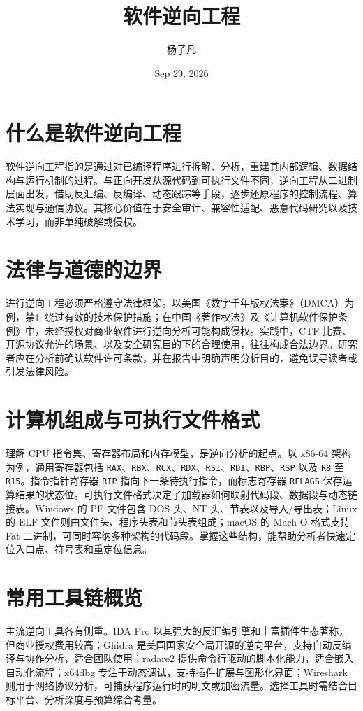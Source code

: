\title{软件逆向工程}
\author{杨子凡}
\date{Sep 29, 2026}
\maketitle
\chapter{什么是软件逆向工程}
软件逆向工程指的是通过对已编译程序进行拆解、分析，重建其内部逻辑、数据结构与运行机制的过程。与正向开发从源代码到可执行文件不同，逆向工程从二进制层面出发，借助反汇编、反编译、动态跟踪等手段，逐步还原程序的控制流程、算法实现与通信协议。其核心价值在于安全审计、兼容性适配、恶意代码研究以及技术学习，而非单纯破解或侵权。\par
\chapter{法律与道德的边界}
进行逆向工程必须严格遵守法律框架。以美国《数字千年版权法案》（DMCA）为例，禁止绕过有效的技术保护措施；在中国《著作权法》及《计算机软件保护条例》中，未经授权对商业软件进行逆向分析可能构成侵权。实践中，CTF 比赛、开源协议允许的场景、以及安全研究目的下的合理使用，往往构成合法边界。研究者应在分析前确认软件许可条款，并在报告中明确声明分析目的，避免误导读者或引发法律风险。\par
\chapter{计算机组成与可执行文件格式}
理解 CPU 指令集、寄存器布局和内存模型，是逆向分析的起点。以 x86-64 架构为例，通用寄存器包括 \texttt{RAX}、\texttt{RBX}、\texttt{RCX}、\texttt{RDX}、\texttt{RSI}、\texttt{RDI}、\texttt{RBP}、\texttt{RSP} 以及 \texttt{R8} 至 \texttt{R15}。指令指针寄存器 \texttt{RIP} 指向下一条待执行指令，而标志寄存器 \texttt{RFLAGS} 保存运算结果的状态位。可执行文件格式决定了加载器如何映射代码段、数据段与动态链接表。Windows 的 PE 文件包含 DOS 头、NT 头、节表以及导入/导出表；Linux 的 ELF 文件则由文件头、程序头表和节头表组成；macOS 的 Mach-O 格式支持 Fat 二进制，可同时容纳多种架构的代码段。掌握这些结构，能帮助分析者快速定位入口点、符号表和重定位信息。\par
\chapter{常用工具链概览}
主流逆向工具各有侧重。IDA Pro 以其强大的反汇编引擎和丰富插件生态著称，但商业授权费用较高；Ghidra 是美国国家安全局开源的逆向平台，支持自动反编译与协作分析，适合团队使用；radare2 提供命令行驱动的脚本化能力，适合嵌入自动化流程；x64dbg 专注于动态调试，支持插件扩展与图形化界面；Wireshark 则用于网络协议分析，可捕获程序运行时的明文或加密流量。选择工具时需结合目标平台、分析深度与预算综合考量。\par
